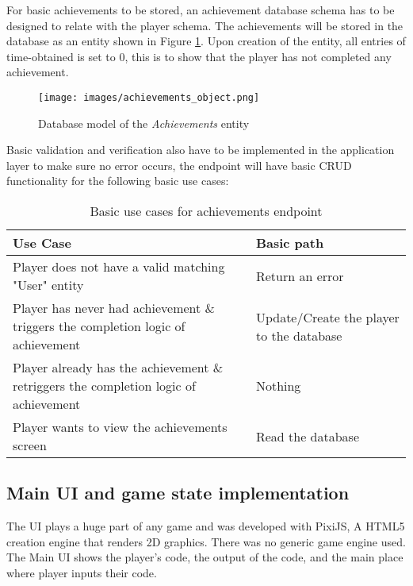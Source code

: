 For basic achievements to be stored, an achievement database schema has to be designed to relate with the player schema. The achievements will be stored in the database as an entity shown in Figure \ref{fig:achievements_object}. Upon creation of the entity, all entries of time-obtained is set to 0, this is to show that the player has not completed any achievement.
\begin{figure}[H]
    \centering
    \texttt{[image: images/achievements\_object.png]}
    \caption{Database model of the \textit{Achievements} entity}    
    \label{fig:achievements_object}
\end{figure}
Basic validation and verification also have to be implemented in the application layer to make sure no error occurs, the endpoint will have basic CRUD functionality for the following basic use cases:
\begin{table}[H]
    \caption{Basic use cases for achievements endpoint}
    \begin{tabular}{|p{11cm}|p{5cm}|}
        \hline
        Use Case & Basic path\\
        \hline
        Player does not have a valid matching "User" entity & Return an error\\
        \hline
        Player has never had achievement \& triggers the completion logic of achievement & Update/Create the player to the database\\
        \hline
        Player already has the achievement \& retriggers the completion logic of achievement & Nothing \\
        \hline
        Player wants to view the achievements screen & Read the database\\
        \hline
    \end{tabular}
\end{table}

\subsection{Main UI and game state implementation}
The UI plays a huge part of any game and was developed with PixiJS, A HTML5 creation engine that renders 2D graphics. There was no generic game engine used. The Main UI shows the player's code, the output of the code, and the main place where player inputs their code.

